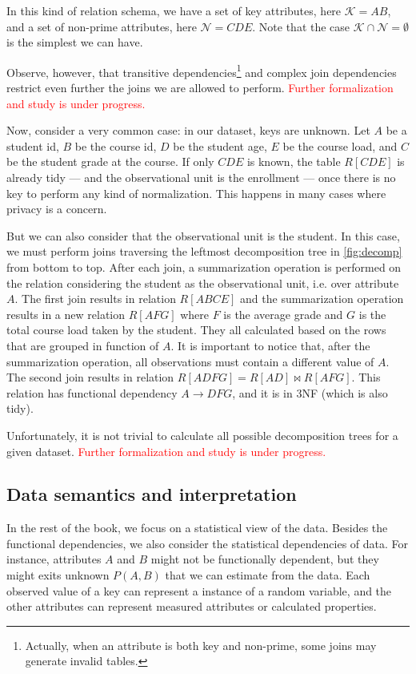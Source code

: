 In this kind of relation schema, we have a set of key attributes, here $\mathcal{K} = AB$,
and a set of non-prime attributes, here $\mathcal{N} = CDE$.  Note that the case
$\mathcal{K} \cap \mathcal{N} = \emptyset$ is the simplest we can have.

Observe, however, that transitive dependencies\footnote{Actually, when an attribute is
both key and non-prime, some joins may generate invalid tables.} and complex join
dependencies restrict even further the joins we are allowed to perform.
\textcolor{red}{Further formalization and study is under progress.}

Now, consider a very common case: in our dataset, keys are unknown.  Let $A$ be a student
id, $B$ be the course id, $D$ be the student age, $E$ be the course load, and $C$ be the
student grade at the course.  If only $CDE$ is known, the table $R[CDE]$ is already tidy
--- and the observational unit is the enrollment --- once there is no key to perform any
kind of normalization.  This happens in many cases where privacy is a concern.

But we can also consider that the observational unit is the student.  In this case, we
must perform joins traversing the leftmost decomposition tree in \cref{fig:decomp} from
bottom to top.  After each join, a summarization operation is performed on the relation
considering the student as the observational unit, i.e. over attribute $A$.  The first
join results in relation $R[ABCE]$ and the summarization operation results in a new
relation $R[AFG]$ where $F$ is the average grade and $G$ is the total course load taken by
the student.  They all calculated based on the rows that are grouped in function of $A$.
It is important to notice that, after the summarization operation, all observations must
contain a different value of $A$.  The second join results in relation $R[ADFG] = R[AD]
\bowtie R[AFG]$.  This relation has functional dependency $A \to DFG$, and it is in 3NF
(which is also tidy).

Unfortunately, it is not trivial to calculate all possible decomposition trees for a given
dataset.  \textcolor{red}{Further formalization and study is under progress.}

\subsection{Data semantics and interpretation}

In the rest of the book, we focus on a statistical view of the data.  Besides the
functional dependencies, we also consider the statistical dependencies of data.  For
instance, attributes $A$ and $B$ might not be functionally dependent, but they might exits
unknown $P(A, B)$ that we can estimate from the data.  Each observed value of a key can
represent a instance of a random variable, and the other attributes can represent
measured attributes or calculated properties.


